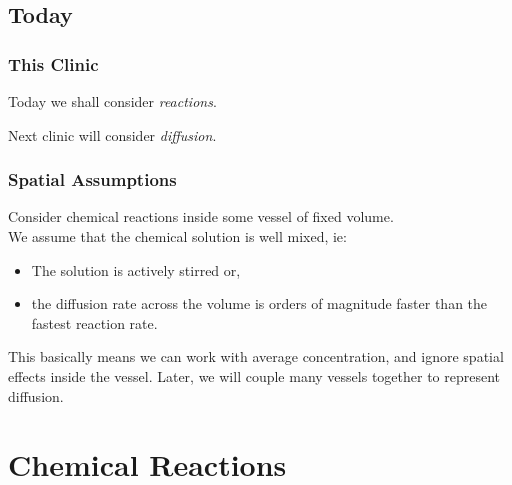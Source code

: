 \documentclass[10pt,reqno]{beamer}
\begin{document}
\subsection{Today}
\begin{frame}
\frametitle{This Clinic}
Today we shall consider \emph{reactions}.
\vfill

Next clinic will consider \emph{diffusion}.

\vfill

\end{frame}
\begin{frame}
\frametitle{Spatial Assumptions}
Consider chemical reactions inside some vessel of fixed volume.\\
We assume that the chemical solution is well mixed, ie:
\begin{itemize}
	\item The solution is actively stirred or,
	\item the diffusion rate across the volume is orders of magnitude faster than the fastest reaction rate.
\end{itemize}
\vfill
This basically means we can work with average concentration, and ignore spatial effects inside the vessel.
\vfill
Later, we will couple many vessels together to represent diffusion.
\end{frame}
\section{Chemical Reactions}
\end{document}
